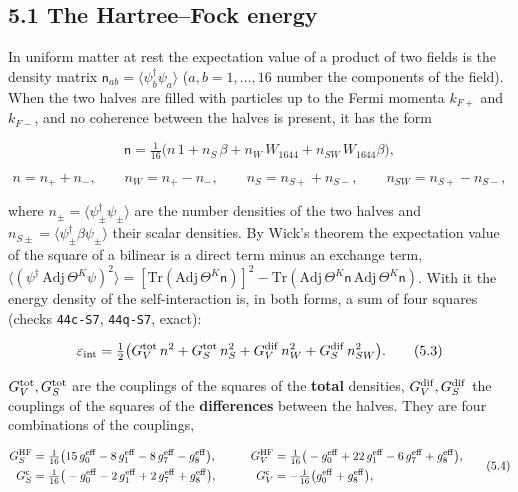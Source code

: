\documentclass[
  10pt,
]{article}
\begin{document}
\hypertarget{the-hartreefock-energy}{%
\subsection{5.1 The Hartree--Fock energy}\label{the-hartreefock-energy}}

In uniform matter at rest the expectation value of a product of two
fields is the density matrix
\(\mathsf n_{ab}=\langle\psi_b^\dagger\psi_a\rangle\)
(\(a,b=1,\dots,16\) number the components of the field). When the two
halves are filled with particles up to the Fermi momenta \(k_{F+}\) and
\(k_{F-}\), and no coherence between the halves is present, it has the
form

\[\mathsf n=\tfrac1{16}\big(n\,1+n_S\,\beta+n_W\,W_{1644}+n_{SW}\,W_{1644}\beta\big),\tag{5.1}\]

\[n=n_++n_-,\qquad n_W=n_+-n_-,\qquad n_S=n_{S+}+n_{S-},\qquad n_{SW}=n_{S+}-n_{S-},\tag{5.2}\]

where \(n_\pm=\langle\psi_\pm^\dagger\psi_\pm\rangle\) are the number
densities of the two halves and
\(n_{S\pm}=\langle\psi_\pm^\dagger\beta\psi_\pm\rangle\) their scalar
densities. By Wick's theorem the expectation value of the square of a
bilinear is a direct term minus an exchange term,
\(\langle(\psi^\dagger\,\mathrm{Adj}\,\Theta^K\psi)^2\rangle=[\mathrm{Tr}(\mathrm{Adj}\,\Theta^K\mathsf n)]^2-\mathrm{Tr}(\mathrm{Adj}\,\Theta^K\mathsf n\,\mathrm{Adj}\,\Theta^K\mathsf n)\).
With it the energy density of the self-interaction is, in both forms, a
sum of four squares (checks \texttt{44c-S7}, \texttt{44q-S7}, exact):

\[\varepsilon_{\rm int}=\tfrac12\big(G_V^{\rm tot}\,n^2+G_S^{\rm tot}\,n_S^2+G_V^{\rm dif}\,n_W^2+G_S^{\rm dif}\,n_{SW}^2\big).\tag{5.3}\]

\(G_V^{\rm tot},G_S^{\rm tot}\) are the couplings of the squares of the
\textbf{total} densities, \(G_V^{\rm dif},G_S^{\rm dif}\) the couplings
of the squares of the \textbf{differences} between the halves. They are
four combinations of the couplings,

\[\begin{aligned}
G_S^{\rm HF}&=\tfrac1{16}\big(15\,g_0^{\rm eff}-8\,g_1^{\rm eff}-8\,g_7^{\rm eff}-g_8^{\rm eff}\big),&\qquad
G_V^{\rm HF}&=\tfrac1{16}\big(-g_0^{\rm eff}+22\,g_1^{\rm eff}-6\,g_7^{\rm eff}+g_8^{\rm eff}\big),\\
G_S^{\rm c}&=\tfrac1{16}\big(-g_0^{\rm eff}-2\,g_1^{\rm eff}+2\,g_7^{\rm eff}+g_8^{\rm eff}\big),&\qquad
G_V^{\rm c}&=-\tfrac1{16}\big(g_0^{\rm eff}+g_8^{\rm eff}\big),
\end{aligned}\tag{5.4}\]
\end{document}
